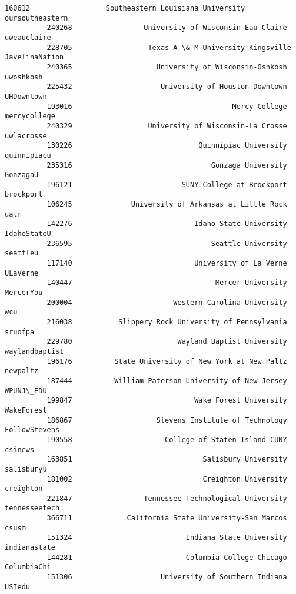 \documentclass[11pt]{article}
\begin{document}
\begin{Verbatim}[commandchars=\\\{\}]
          160612                  Southeastern Louisiana University  oursoutheastern   
          240268                 University of Wisconsin-Eau Claire      uweauclaire   
          228705                  Texas A \& M University-Kingsville   JavelinaNation   
          240365                    University of Wisconsin-Oshkosh        uwoshkosh   
          225432                     University of Houston-Downtown       UHDowntown   
          193016                                      Mercy College     mercycollege   
          240329                  University of Wisconsin-La Crosse       uwlacrosse   
          130226                              Quinnipiac University      quinnipiacu   
          235316                                 Gonzaga University         GonzagaU   
          196121                          SUNY College at Brockport        brockport   
          106245              University of Arkansas at Little Rock             ualr   
          142276                             Idaho State University      IdahoStateU   
          236595                                 Seattle University         seattleu   
          117140                             University of La Verne         ULaVerne   
          140447                                  Mercer University        MercerYou   
          200004                        Western Carolina University              wcu   
          216038           Slippery Rock University of Pennsylvania          sruofpa   
          229780                         Wayland Baptist University   waylandbaptist   
          196176          State University of New York at New Paltz         newpaltz   
          187444          William Paterson University of New Jersey        WPUNJ\_EDU   
          199847                             Wake Forest University       WakeForest   
          186867                    Stevens Institute of Technology    FollowStevens   
          190558                      College of Staten Island CUNY          csinews   
          163851                               Salisbury University       salisburyu   
          181002                               Creighton University        creighton   
          221847                 Tennessee Technological University    tennesseetech   
          366711             California State University-San Marcos            csusm   
          151324                           Indiana State University     indianastate   
          144281                           Columbia College-Chicago      ColumbiaChi   
          151306                     University of Southern Indiana           USIedu   

\end{Verbatim}
\end{document}
